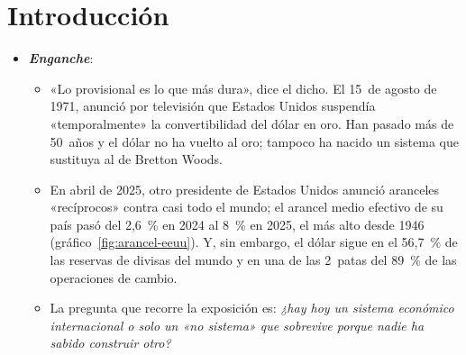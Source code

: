 \documentclass[11pt]{article}
\begin{document}
\tceetitulo

\section*{Introducción}

\begin{itemize}
\item \textbf{\emph{Enganche}}:
  \begin{itemize}
  \item «Lo provisional es lo que más dura», dice el dicho. El 15~de agosto de 1971,  anunció por televisión que Estados Unidos suspendía «temporalmente» la convertibilidad del dólar en oro\nocite{Nixon1971Discurso}. Han pasado más de 50~años y el dólar no ha vuelto al oro; tampoco ha nacido un sistema que sustituya al de Bretton Woods.
  \item En abril de 2025, otro presidente de Estados Unidos anunció aranceles «recíprocos» contra casi todo el mundo; el arancel medio efectivo de su país pasó del 2,6~\% en 2024 al 8~\% en 2025, el más alto desde 1946 (gráfico~\ref{fig:arancel-eeuu})\nocite{CasaBlanca2025Reciprocos,BEA2026Aranceles}. Y, sin embargo, el dólar sigue en el 56,7~\% de las reservas de divisas del mundo y en una de las 2~patas del 89~\% de las operaciones de cambio\nocite{FMI2026COFER,BIS2025Trienal}.
  \item La pregunta que recorre la exposición es: \emph{¿hay hoy un sistema económico internacional o solo un «no sistema» que sobrevive porque nadie ha sabido construir otro?}
  \end{itemize}


\end{itemize}
\end{document}
